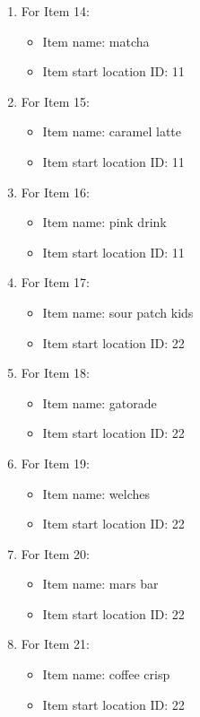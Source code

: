 \documentclass[11pt]{article}
\begin{document}
\begin{enumerate}
\begin{enumerate}
        \item For Item 14:
    \begin{itemize}
    \item Item name: matcha
    \item Item start location ID: 11
    \end{itemize}
        \item For Item 15:
    \begin{itemize}
    \item Item name: caramel latte
    \item Item start location ID: 11
    \end{itemize}
        \item For Item 16:
    \begin{itemize}
    \item Item name: pink drink
    \item Item start location ID: 11
    \end{itemize}
        \item For Item 17:
    \begin{itemize}
    \item Item name: sour patch kids
    \item Item start location ID: 22
    \end{itemize}
        \item For Item 18:
    \begin{itemize}
    \item Item name: gatorade
    \item Item start location ID: 22
    \end{itemize}
        \item For Item 19:
    \begin{itemize}
    \item Item name: welches
    \item Item start location ID: 22
    \end{itemize}
        \item For Item 20:
    \begin{itemize}
    \item Item name: mars bar
    \item Item start location ID: 22
    \end{itemize}
        \item For Item 21:
    \begin{itemize}
    \item Item name: coffee crisp
    \item Item start location ID: 22
    \end{itemize}
\end{enumerate}


\end{enumerate}
\end{document}
